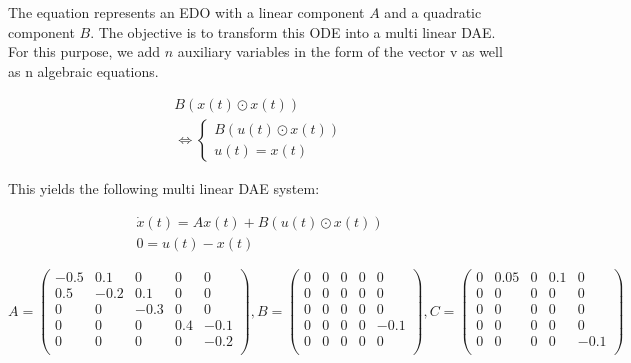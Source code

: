 \documentclass{article}
\begin{document}
The equation represents an EDO with a linear component $A$ and a quadratic component $B$.
The objective is to transform this ODE into a multi linear DAE.
For this purpose, we add $n$ auxiliary variables in the form of the vector v as well as n algebraic equations.

\begin{align}
    B(x(t) \odot x(t)) \\
    \Leftrightarrow \left\{
        \begin{array}{ll}
            B(u(t) \odot x(t)) \\
            u(t) = x(t)
        \end{array}
    \right.
\end{align}

This yields the following multi linear DAE system:

\begin{align}
    \dot{x}(t) = Ax(t) + B(u(t) \odot x(t)) \\
    0 = u(t) - x(t)
\end{align}

\begin{equation}
    A =
    \begin{pmatrix}
        -0.5 & 0.1 & 0 & 0 & 0 \\
        0.5 & -0.2 & 0.1 & 0 & 0 \\
        0 & 0 & -0.3 & 0 & 0 \\
        0 & 0 & 0 & 0.4 & -0.1 \\
        0 & 0 & 0 & 0 & -0.2 \\
    \end{pmatrix},

    B = 
    \begin{pmatrix}
        0 & 0 & 0 & 0 & 0 \\
        0 & 0& 0 & 0 & 0 \\
        0 & 0 & 0 & 0 & 0 \\
        0 & 0 & 0 & 0 & -0.1 \\
        0 & 0 & 0 & 0 & 0 \\
    \end{pmatrix},

    C = 
    \begin{pmatrix}
        0 & 0.05 & 0 & 0.1 & 0 \\
        0 & 0& 0 & 0 & 0 \\
        0 & 0 & 0 & 0 & 0 \\
        0 & 0 & 0 & 0 & 0 \\
        0 & 0 & 0 & 0 & -0.1 \\
    \end{pmatrix}
\end{equation}
\end{document}
